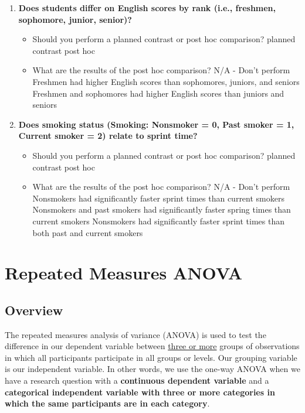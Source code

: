 \documentclass[
]{book}
\begin{document}
\begin{enumerate}
\def\labelenumi{\arabic{enumi}.}
\item
  \textbf{Does students differ on English scores by rank (i.e., freshmen, sophomore, junior, senior)?}

  \begin{itemize}
  \item
    Should you perform a planned contrast or post hoc comparison? planned contrast post hoc
  \item
    What are the results of the post hoc comparison? N/A - Don't perform Freshmen had higher English scores than sophomores, juniors, and seniors Freshmen and sophomores had higher English scores than juniors and seniors
  \end{itemize}
\item
  \textbf{Does smoking status (Smoking: Nonsmoker = 0, Past smoker = 1, Current smoker = 2) relate to sprint time?}

  \begin{itemize}
  \item
    Should you perform a planned contrast or post hoc comparison? planned contrast post hoc
  \item
    What are the results of the post hoc comparison? N/A - Don't perform Nonsmokers had significantly faster sprint times than current smokers Nonsmokers and past smokers had significantly faster spring times than current smokers Nonsmokers had significantly faster sprint times than both past and current smokers
  \end{itemize}
\end{enumerate}

\hypertarget{repeated-measures-anova}{%
\section{Repeated Measures ANOVA}\label{repeated-measures-anova}}

\hypertarget{overview-7}{%
\subsection{Overview}\label{overview-7}}

The repeated measures analysis of variance (ANOVA) is used to test the difference in our dependent variable between \underline{three or more} groups of observations in which all participants participate in all groups or levels. Our grouping variable is our independent variable. In other words, we use the one-way ANOVA when we have a research question with a \textbf{continuous dependent variable} and a \textbf{categorical independent variable with three or more categories in which the same participants are in each category}.
\end{document}
